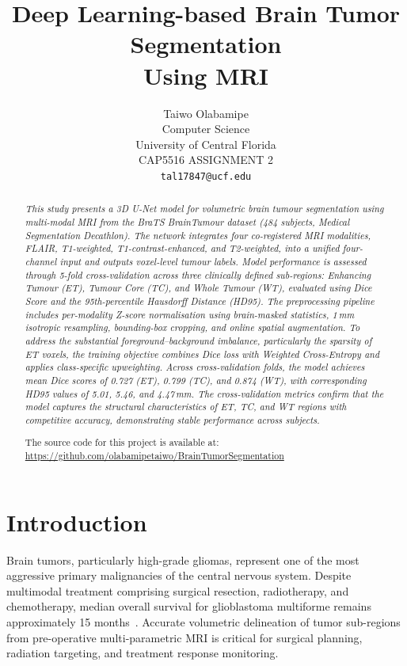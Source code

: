 \documentclass[10pt,twocolumn]{article}
\title{\textbf{Deep Learning-based Brain Tumor Segmentation\\Using MRI}}
\author{
  Taiwo Olabamipe \\
  Computer Science \\
  University of Central Florida \\
  CAP5516 ASSIGNMENT 2 \\
  \texttt{tal17847@ucf.edu}
}
\date{}
\begin{document}
\maketitle

\begin{abstract}
\textit{
This study presents a 3D U-Net model for volumetric brain tumour segmentation using multi-modal MRI from the BraTS BrainTumour dataset (484 subjects, Medical Segmentation Decathlon). The network integrates four co-registered MRI modalities, FLAIR, T1-weighted, T1-contrast-enhanced, and T2-weighted, into a unified four-channel input and outputs voxel-level tumour labels. Model performance is assessed through 5-fold cross-validation across three clinically defined sub-regions: Enhancing Tumour (ET), Tumour Core (TC), and Whole Tumour (WT), evaluated using Dice Score and the 95th-percentile Hausdorff Distance (HD95).  The preprocessing pipeline includes per-modality Z-score normalisation using brain-masked statistics, 1\,mm isotropic resampling, bounding-box cropping, and online spatial augmentation. To address the substantial foreground--background imbalance, particularly the sparsity of ET voxels, the training objective combines Dice loss with Weighted Cross-Entropy and applies class-specific upweighting. Across cross-validation folds, the model achieves mean Dice scores of 0.727 (ET), 0.799 (TC), and 0.874 (WT), with corresponding HD95 values of 5.01, 5.46, and 4.47\,mm. The cross-validation metrics confirm that the model captures the structural characteristics of ET, TC, and WT regions with competitive accuracy, demonstrating stable performance across subjects.
}

\medskip
The source code for this project is available at:
\url{https://github.com/olabamipetaiwo/BrainTumorSegmentation}
\end{abstract}

\section{Introduction}

Brain tumors, particularly high-grade gliomas, represent one of
the most aggressive primary malignancies of the central nervous
system. Despite multimodal treatment comprising surgical
resection, radiotherapy, and chemotherapy, median overall
survival for glioblastoma multiforme remains approximately 15
months~\cite{menze2015}. Accurate volumetric delineation of tumor
sub-regions from pre-operative multi-parametric MRI is critical
for surgical planning, radiation targeting, and treatment response
monitoring.
\end{document}
